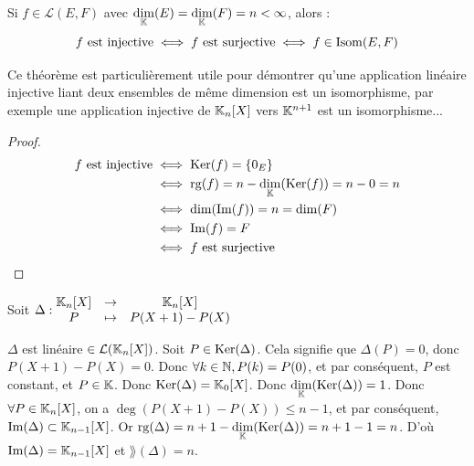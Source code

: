 \documentclass[12pt, a4paper]{report}
\begin{document}
\begin{theorem}
    Si $f \in \mathcal L(E,F)$ avec $\underset{\mathbb{K}}\dim(E) = \underset{\mathbb{K}}\dim(F) = n < \infty$, alors :
    $$f \text{ est injective} \iff f \textrm{ est surjective} \iff f \in \mathrm{Isom}(E,F)$$
\end{theorem}

\begin{methodbox}
    Ce théorème est particulièrement utile pour démontrer qu'une application linéaire injective liant deux ensembles de même dimension est un isomorphisme, par exemple une application injective de $\mathbb{K}_n[X]$ vers $\mathbb{K}^{n+1}$ est un isomorphisme...
\end{methodbox}

\begin{proof}
    \begin{align*}
    f \text{ est injective} &\iff \mathrm{Ker}(f) = \{0_E\}\\
    &\iff \mathrm{rg}(f) = n - \underset{\mathbb{K}}\dim(\mathrm{Ker}(f)) = n - 0 = n\\
    &\iff \dim(\mathrm{Im}(f)) = n = \dim(F)\\
    &\iff \mathrm{Im}(f) = F\\
    &\iff f \text{ est surjective}
    \end{align*}
\end{proof}

\begin{example}
    Soit $\Delta : \begin{matrix}
    \mathbb{K}_n[X] &\to &\mathbb{K}_n[X]\\
    P &\mapsto &P(X+1) - P(X)
    \end{matrix}$

    \begin{outline}
        \1 $\Delta$ est linéaire $\in \mathcal L(\mathbb{K}_n[X])$.
        \1 Soit $P \in \mathrm{Ker}(\Delta)$. Cela signifie que $\Delta(P) = 0$, donc $P(X+1) - P(X) = 0$.
        \1 Donc $\forall k \in \mathbb{N}, P(k) = P(0)$, et par conséquent, $P$ est constant, et $P \in \mathbb{K}$.
        \1 Donc $\mathrm{Ker}(\Delta) = \mathbb{K}_0[X]$.
        \1 Donc $\underset{\mathbb{K}}\dim(\mathrm{Ker}(\Delta)) = 1$.
        \1 Donc $\forall P \in \mathbb{K}_n[X]$, on a $\deg(P(X+1) - P(X)) \le n-1$, et par conséquent, $\mathrm{Im}(\Delta) \subset \mathbb{K}_{n-1}[X]$.
        \1 Or  $\mathrm{rg}(\Delta) = n+1 - \underset{\mathbb{K}}\dim(\mathrm{Ker}(\Delta)) = n+1 - 1 = n$.
        \1 D'où $\mathrm{Im}(\Delta) = \mathbb{K}_{n-1}[X]$ et $\rang(\Delta) = n$.
    \end{outline}
\end{example}
\end{document}

